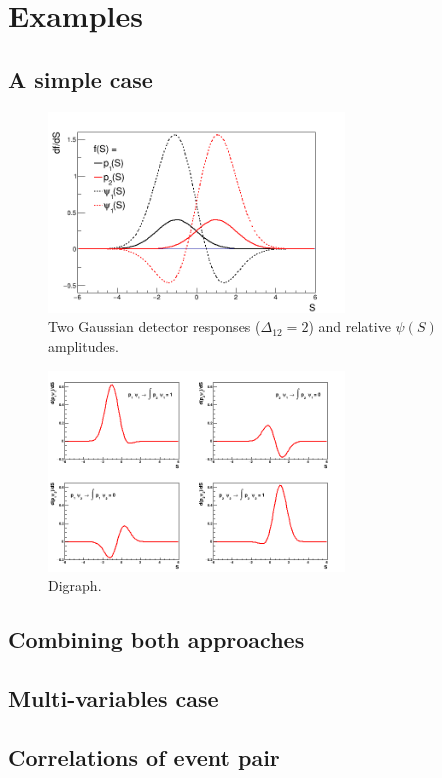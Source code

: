 \section{Examples}
\subsection{A simple case}

\begin{figure}[!htb]
\centering
\includegraphics[width=0.7\textwidth]{../png/figGaus2.png}
\caption{Two Gaussian detector responses ($\Delta_{12} = 2$) and relative
  $\psi(S)$ amplitudes.}
\label{fig:Gaus2}
\end{figure}

\begin{figure}[!htb]
\centering
\includegraphics[width=0.7\textwidth]{../png/figSPgaus.png}
\caption{Digraph.}
\label{fig:Gaus2}
\end{figure}

\subsection{Combining both approaches}

\subsection{Multi-variables case}

\subsection{Correlations of event pair}

